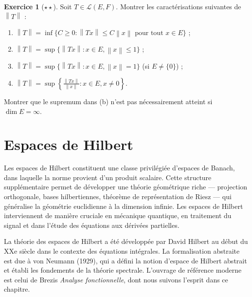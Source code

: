 \documentclass[a4paper,12pt]{book}
\newcommand{\norm}[1]{\left\| #1 \right\|}
\theoremstyle{definition}
\newtheorem{exercice}{Exercice}[chapter]
\theoremstyle{plain}
\theoremstyle{remark}
\begin{document}
\begin{exercice}[$\star\star$]\label{exo:ch1-norme-image}
Soit $T \in \mathcal{L}(E, F)$. Montrer les caractérisations suivantes de $\norm{T}$ :
\begin{enumerate}[label=(\alph*)]
    \item $\norm{T} = \inf\{C \geq 0 : \norm{Tx} \leq C\norm{x} \text{ pour tout } x \in E\}$ ;
    \item $\norm{T} = \sup\{\norm{Tx} : x \in E, \norm{x} \leq 1\}$ ;
    \item $\norm{T} = \sup\{\norm{Tx} : x \in E, \norm{x} = 1\}$ (si $E \neq \{0\}$) ;
    \item $\norm{T} = \sup\left\{\frac{\norm{Tx}}{\norm{x}} : x \in E, x \neq 0\right\}$.
\end{enumerate}
Montrer que le supremum dans (b) n'est pas nécessairement atteint si $\dim E = \infty$.
\end{exercice}


\chapter{Espaces de Hilbert}
\minitoc
\vspace{1cm}

Les espaces de Hilbert constituent une classe privilégiée d'espaces de Banach, dans laquelle la norme provient d'un produit scalaire. Cette structure supplémentaire permet de développer une théorie géométrique riche --- projection orthogonale, bases hilbertiennes, théorème de représentation de Riesz --- qui généralise la géométrie euclidienne à la dimension infinie. Les espaces de Hilbert interviennent de manière cruciale en mécanique quantique, en traitement du signal et dans l'étude des équations aux dérivées partielles.

La théorie des espaces de Hilbert a été développée par David Hilbert au début du XXe siècle dans le contexte des équations intégrales. La formalisation abstraite est due à von Neumann (1929), qui a défini la notion d'espace de Hilbert abstrait et établi les fondements de la théorie spectrale. L'ouvrage de référence moderne est celui de Brezis \emph{Analyse fonctionnelle}, dont nous suivons l'esprit dans ce chapitre.
\end{document}
